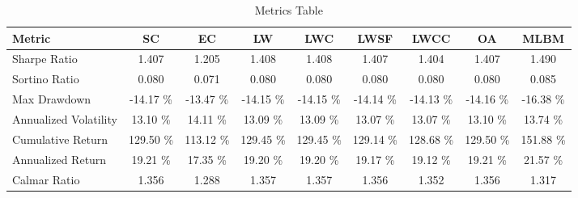 \begin{table}[H]
\centering
\begin{tabular}{lcccccccc}
\toprule
Metric & SC & EC & LW & LWC & LWSF & LWCC & OA & MLBM \\
\midrule
Sharpe Ratio & 1.407 & 1.205 & 1.408 & 1.408 & 1.407 & 1.404 & 1.407 & 1.490 \\
Sortino Ratio & 0.080 & 0.071 & 0.080 & 0.080 & 0.080 & 0.080 & 0.080 & 0.085 \\
Max Drawdown & -14.17 \% & -13.47 \% & -14.15 \% & -14.15 \% & -14.14 \% & -14.13 \% & -14.16 \% & -16.38 \% \\
Annualized Volatility & 13.10 \% & 14.11 \% & 13.09 \% & 13.09 \% & 13.07 \% & 13.07 \% & 13.10 \% & 13.74 \% \\
Cumulative Return & 129.50 \% & 113.12 \% & 129.45 \% & 129.45 \% & 129.14 \% & 128.68 \% & 129.50 \% & 151.88 \% \\
Annualized Return & 19.21 \% & 17.35 \% & 19.20 \% & 19.20 \% & 19.17 \% & 19.12 \% & 19.21 \% & 21.57 \% \\
Calmar Ratio & 1.356 & 1.288 & 1.357 & 1.357 & 1.356 & 1.352 & 1.356 & 1.317 \\
\bottomrule
\end{tabular}
\caption{Metrics Table}
\label{tab:metrics_table}
\end{table}